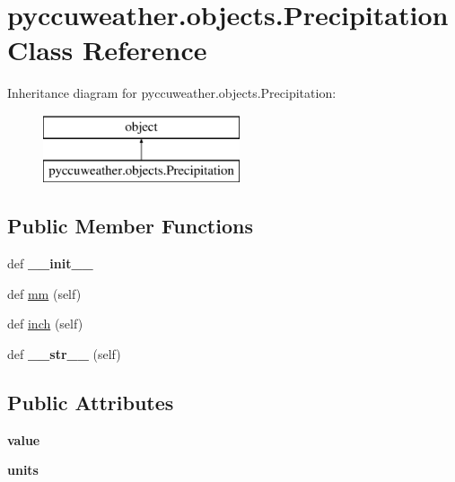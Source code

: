 \hypertarget{classpyccuweather_1_1objects_1_1_precipitation}{}\section{pyccuweather.\+objects.\+Precipitation Class Reference}
\label{classpyccuweather_1_1objects_1_1_precipitation}
Inheritance diagram for pyccuweather.\+objects.\+Precipitation\+:\begin{figure}[H]
\begin{center}
\leavevmode
\includegraphics[height=2.000000cm]{classpyccuweather_1_1objects_1_1_precipitation}
\end{center}
\end{figure}
\subsection*{Public Member Functions}
\begin{DoxyCompactItemize}
\item 
\hypertarget{classpyccuweather_1_1objects_1_1_precipitation_a5ffbf00c9b8eacdbcba345c1fbbfabf2}{}def {\bfseries \+\_\+\+\_\+init\+\_\+\+\_\+}\label{classpyccuweather_1_1objects_1_1_precipitation_a5ffbf00c9b8eacdbcba345c1fbbfabf2}

\item 
def \hyperlink{classpyccuweather_1_1objects_1_1_precipitation_a581b3112ef01ae6556ca8e4c204e2115}{mm} (self)
\item 
def \hyperlink{classpyccuweather_1_1objects_1_1_precipitation_a3307c99c0b042d504cdbe1431f0d4251}{inch} (self)
\item 
\hypertarget{classpyccuweather_1_1objects_1_1_precipitation_ae880fb9914853a7cbc3bb155bcc48dc8}{}def {\bfseries \+\_\+\+\_\+str\+\_\+\+\_\+} (self)\label{classpyccuweather_1_1objects_1_1_precipitation_ae880fb9914853a7cbc3bb155bcc48dc8}

\end{DoxyCompactItemize}
\subsection*{Public Attributes}
\begin{DoxyCompactItemize}
\item 
\hypertarget{classpyccuweather_1_1objects_1_1_precipitation_a04d15b0c527ceb6f82f4f686e1bc6b49}{}{\bfseries value}\label{classpyccuweather_1_1objects_1_1_precipitation_a04d15b0c527ceb6f82f4f686e1bc6b49}

\item 
\hypertarget{classpyccuweather_1_1objects_1_1_precipitation_a86d6ad010715eccd5a2c7161e7b3bbd1}{}{\bfseries units}\label{classpyccuweather_1_1objects_1_1_precipitation_a86d6ad010715eccd5a2c7161e7b3bbd1}

\end{DoxyCompactItemize}


